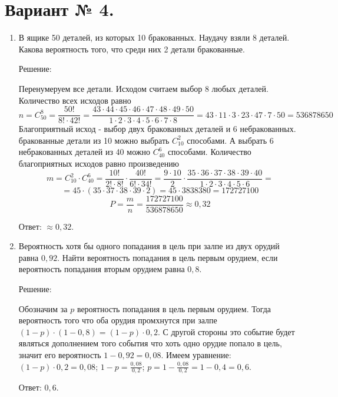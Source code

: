 \documentclass{article}
\begin{document}
\section*{Вариант № 4.}
\begin{enumerate}

\item %
В ящике 50 деталей, из которых 10 бракованных. Наудачу взяли 8 деталей. Какова вероятность того, что среди них 2 детали бракованные.
\begin{center}Решение:\end{center}
Перенумеруем все детали. Исходом считаем выбор 8 любых деталей.
Количество всех исходов равно
$$n=C_{50}^{8}=\frac{50!}{8!\cdot42!}=\frac{43\cdot44\cdot45\cdot46\cdot47\cdot48\cdot49\cdot50}{1\cdot2\cdot3\cdot4\cdot5\cdot6\cdot7\cdot8}=43\cdot11\cdot3\cdot23\cdot47\cdot7\cdot50=536878650$$
Благоприятный исход - выбор двух бракованных деталей и 6 небракованных.  бракованные детали из 10 можно выбрать $C_{10}^{2}$ способами. А выбрать 6 небракованных деталей из 40 можно $C_{40}^{6}$ способами. \newline
Количество благоприятных исходов равно произведению
$$m=C_{10}^{2}\cdot C_{40}^{6}=\frac{10!}{2!\cdot8!}\cdot\frac{40!}{6!\cdot34!}=\frac{9\cdot10}{2}\cdot\frac{35\cdot36\cdot37\cdot38\cdot39\cdot40}{1\cdot2\cdot3\cdot4\cdot5\cdot6}=$$
$$=45\cdot(35\cdot37\cdot38\cdot39\cdot2)=45\cdot3838380=172727100$$
$$P=\frac{m}{n}=\frac{172727100}{536878650}\approx0,32$$

Ответ: $\approx0,32$.

\item %
Вероятность хотя бы одного попадания в цель при залпе из двух орудий равна $0,92$. Найти вероятность попадания в цель первым орудием, если вероятность попадания вторым орудием равна $0,8$.
\begin{center}Решение:\end{center}
Обозначим за $p$ вероятность попадания в цель первым орудием. Тогда вероятность того что оба орудия промхнутся при залпе $(1-p)\cdot(1-0,8)=(1-p)\cdot0,2$. С другой стороны это событие будет являться дополнением того события что хоть одно орудие попало в цель, значит его вероятность $1-0,92=0,08$. \newline Имеем уравнение:
$(1-p)\cdot0,2=0,08$;
$1-p=\frac{0,08}{0,2}$;
$p=1-\frac{0,08}{0,2}=1-0,4=0,6$.

Ответ: $0,6$.


\end{enumerate}
\end{document}
